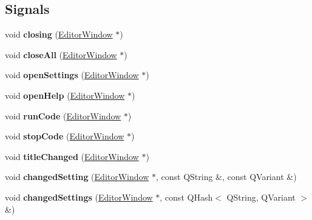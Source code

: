 \subsection*{Signals}
\begin{DoxyCompactItemize}
\item 
\hypertarget{classEditorWindow_ab5059ac20da670e1c2bb3e7e6e498aa1}{void {\bfseries closing} (\hyperlink{classEditorWindow}{Editor\+Window} $\ast$)}\label{classEditorWindow_ab5059ac20da670e1c2bb3e7e6e498aa1}

\item 
\hypertarget{classEditorWindow_a8e82f25b8aaa98fdcbd80ffbf4f2f01c}{void {\bfseries close\+All} (\hyperlink{classEditorWindow}{Editor\+Window} $\ast$)}\label{classEditorWindow_a8e82f25b8aaa98fdcbd80ffbf4f2f01c}

\item 
\hypertarget{classEditorWindow_a5a18c4334a66f2152f814690f27423c7}{void {\bfseries open\+Settings} (\hyperlink{classEditorWindow}{Editor\+Window} $\ast$)}\label{classEditorWindow_a5a18c4334a66f2152f814690f27423c7}

\item 
\hypertarget{classEditorWindow_a12b01e035aef46c087d4fa972748b4c9}{void {\bfseries open\+Help} (\hyperlink{classEditorWindow}{Editor\+Window} $\ast$)}\label{classEditorWindow_a12b01e035aef46c087d4fa972748b4c9}

\item 
\hypertarget{classEditorWindow_a099b128c5e948867df18babd7c6b14ca}{void {\bfseries run\+Code} (\hyperlink{classEditorWindow}{Editor\+Window} $\ast$)}\label{classEditorWindow_a099b128c5e948867df18babd7c6b14ca}

\item 
\hypertarget{classEditorWindow_af4ca2e0be1bb3098a8c94473c753d9c2}{void {\bfseries stop\+Code} (\hyperlink{classEditorWindow}{Editor\+Window} $\ast$)}\label{classEditorWindow_af4ca2e0be1bb3098a8c94473c753d9c2}

\item 
\hypertarget{classEditorWindow_a3927cefb23e1026ca7362c99da5f144c}{void {\bfseries title\+Changed} (\hyperlink{classEditorWindow}{Editor\+Window} $\ast$)}\label{classEditorWindow_a3927cefb23e1026ca7362c99da5f144c}

\item 
\hypertarget{classEditorWindow_a512fc6a54509b75d26cdd3b13eae03eb}{void {\bfseries changed\+Setting} (\hyperlink{classEditorWindow}{Editor\+Window} $\ast$, const Q\+String \&, const Q\+Variant \&)}\label{classEditorWindow_a512fc6a54509b75d26cdd3b13eae03eb}

\item 
\hypertarget{classEditorWindow_a7ae350466d88e3d4aeadb5926217809a}{void {\bfseries changed\+Settings} (\hyperlink{classEditorWindow}{Editor\+Window} $\ast$, const Q\+Hash$<$ Q\+String, Q\+Variant $>$ \&)}\label{classEditorWindow_a7ae350466d88e3d4aeadb5926217809a}

\end{DoxyCompactItemize}
